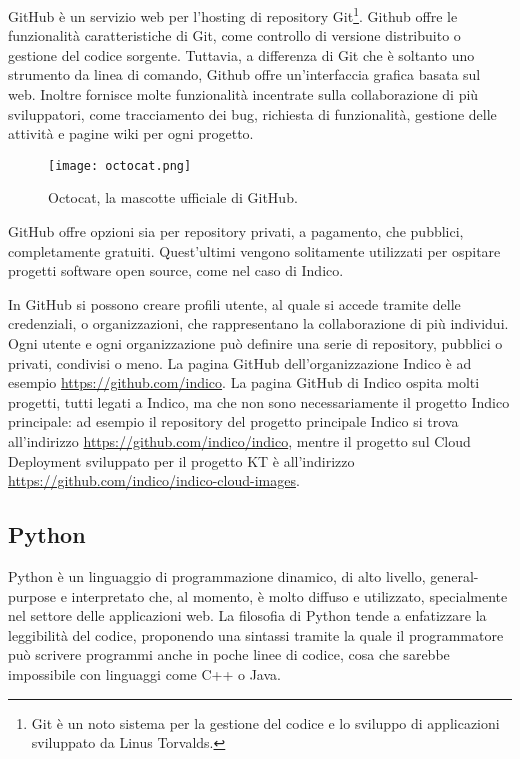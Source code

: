             GitHub è un servizio web per l'hosting di repository Git\footnote{Git è un noto sistema per la gestione del codice e lo sviluppo di applicazioni sviluppato da Linus Torvalds.}. Github offre le funzionalità caratteristiche di Git, come controllo di versione distribuito o gestione del codice sorgente. Tuttavia, a differenza di Git che è soltanto uno strumento da linea di comando, Github offre un'interfaccia grafica basata sul web. Inoltre fornisce molte funzionalità incentrate sulla collaborazione di più sviluppatori, come tracciamento dei bug, richiesta di funzionalità, gestione delle attività e pagine wiki per ogni progetto.
            
        	\begin{figure}[h!]
        		\begin{center}
        			\texttt{[image: octocat.png]}
        		\end{center}
        		\caption[Octocat]{Octocat, la mascotte ufficiale di GitHub.}
        		\label{fig:octocat}
        	\end{figure}
        	
        	GitHub offre opzioni sia per repository privati, a pagamento, che pubblici, completamente gratuiti. Quest'ultimi vengono solitamente utilizzati per ospitare progetti software open source, come nel caso di Indico.
        	
        	In GitHub si possono creare profili utente, al quale si accede tramite delle credenziali, o organizzazioni, che rappresentano la collaborazione di più individui. Ogni utente e ogni organizzazione può definire una serie di repository, pubblici o privati, condivisi o meno. La pagina GitHub dell'organizzazione Indico è ad esempio \url{https://github.com/indico}. La pagina GitHub di Indico ospita molti progetti, tutti legati a Indico, ma che non sono necessariamente il progetto Indico principale: ad esempio il repository del progetto principale Indico si trova all'indirizzo \url{https://github.com/indico/indico}, mentre il progetto sul Cloud Deployment sviluppato per il progetto KT è all'indirizzo \url{https://github.com/indico/indico-cloud-images}.
    
        \subsection{Python} \label{subsec:p;sl;python}
        
            Python è un linguaggio di programmazione dinamico, di alto livello, general-purpose e interpretato che, al momento, è molto diffuso e utilizzato, specialmente nel settore delle applicazioni web. La filosofia di Python tende a enfatizzare la leggibilità del codice, proponendo una sintassi tramite la quale il programmatore può scrivere programmi anche in poche linee di codice, cosa che sarebbe impossibile con linguaggi come C++ o Java. \cite{wiki:python}
        
